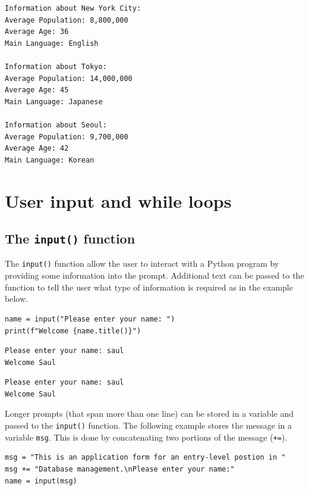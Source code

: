 \documentclass[10pt]{book}
\begin{document}
\begin{enumerate}
\label{orgb6b908b}
\begin{verbatim}
Information about New York City:
Average Population: 8,800,000
Average Age: 36
Main Language: English

Information about Tokyo:
Average Population: 14,000,000
Average Age: 45
Main Language: Japanese

Information about Seoul:
Average Population: 9,700,000
Average Age: 42
Main Language: Korean
\end{verbatim}
\end{enumerate}
\chapter{User input and while loops}
\label{sec:org44aa074}
\section{The \texttt{input()} function}
\label{sec:orgd805712}
The \texttt{input()} function allow the user to interact with a Python program by providing some information into the prompt. Additional text can be passed to the function to tell the user what type of information is required as in the example below.

\label{org9449ee9}
\begin{verbatim}
name = input("Please enter your name: ")
print(f"Welcome {name.title()}")
\end{verbatim}

\label{orgbc38a2b}
\label{org169cd47}
\begin{verbatim}
Please enter your name: saul
Welcome Saul
\end{verbatim}

\label{orgc1957d8}
\begin{verbatim}
Please enter your name: saul
Welcome Saul
\end{verbatim}

Longer prompts (that span more than one line) can be stored in a variable and passed to the \texttt{input()} function. The following example stores the message in a variable \texttt{msg}. This is done by concatenating two portions of the message (\texttt{+=}).

\label{orgb5201ba}
\begin{verbatim}
msg = "This is an application form for an entry-level postion in "
msg += "Database management.\nPlease enter your name:"
name = input(msg)
\end{verbatim}
\end{document}

